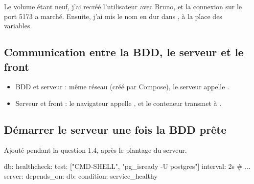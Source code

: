 


Le volume étant neuf, j'ai recréé l'utilisateur avec Bruno, et la connexion sur le port 5173 a marché. Ensuite, j'ai mis le nom  en dur dans , à la place des variables.

\begin{commandes}
\end{commandes}

\subsection{Communication entre la BDD, le serveur et le front}

\begin{itemize}
  \item BDD et serveur : même réseau  (créé par Compose), le serveur appelle .
  \item Serveur et front : le navigateur appelle , et le conteneur  transmet à .
\end{itemize}


\subsection{Démarrer le serveur une fois la BDD prête}

Ajouté pendant la question 1.4, après le plantage du serveur.

\begin{fichier}
  db:
    healthcheck:
      test: ["CMD-SHELL", "pg_isready -U postgres"]
      interval: 2s
      # ...
  server:
    depends_on:
      db:
        condition: service_healthy
\end{fichier}

